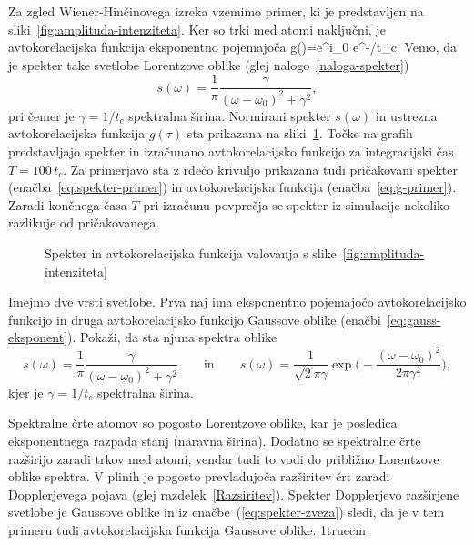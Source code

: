 Za zgled Wiener-Hinčinovega izreka vzemimo primer, ki je predstavljen na 
sliki~\ref{fig:amplituda-intenziteta}. 
Ker so trki med atomi naključni, je avtokorelacijska funkcija eksponentno pojemajoča
\beq
g(\tau)=e^{i\omega_{0}\tau} e^{-\tau/t_{c}}.
\label{eq:g-primer}
\eeq
Vemo, da je spekter take svetlobe Lorentzove 
oblike (glej nalogo~\ref{naloga-spekter})
\begin{equation}
s(\omega)=\frac{1}{\pi}\frac{\gamma}{(\omega-\omega_{0})^{2}+\gamma^{2}},
\label{eq:spekter-primer}
\end{equation}
pri čemer je $\gamma=1/t_{c}$ spektralna širina. 
Normirani spekter $s(\omega)$ in ustrezna avtokorelacijska funkcija $g(\tau)$ 
sta prikazana na sliki~\ref{fig:SpekterAc}. 
Točke na grafih 
predstavljajo spekter in izračunano avtokorelacijsko funkcijo 
za integracijski čas $T=100\,t_{c}$. Za primerjavo sta z rdečo 
krivuljo prikazana tudi pričakovani spekter (enačba~\ref{eq:spekter-primer}) in avtokorelacijska
funkcija (enačba~\ref{eq:g-primer}). Zaradi končnega
časa $T$ pri izračunu povprečja se spekter iz simulacije nekoliko razlikuje
od pričakovanega. 
\begin{figure}[h]
\centering
\def\svgwidth{65truemm} 
\qquad
\def\svgwidth{65truemm} 

\caption{Spekter in avtokorelacijska funkcija valovanja s slike~\ref{fig:amplituda-intenziteta}}
\label{fig:SpekterAc}
\end{figure}

\begin{definition}
\label{naloga-spekter}
Imejmo dve vrsti svetlobe. Prva naj ima eksponentno pojemajočo avtokorelacijsko funkcijo in druga
avtokorelacijsko funkcijo Gaussove oblike (enačbi~\ref{eq:gauss-eksponent}). Pokaži, da sta njuna
spektra oblike
\begin{equation}
s(\omega)=
\frac{1}{\pi}\frac{\gamma}{(\omega-\omega_{0})^{2}+\gamma^{2}} \qquad \mathrm{in} \qquad 
s(\omega)= \frac{1}{\sqrt{2}\pi\gamma}\exp\big(-
\frac{\left(\omega-\omega_{0}\right)^{2}}{2\pi\gamma^{2}}\big),
\end{equation}
kjer je $\gamma=1/t_{c}$ spektralna širina. 
\end{definition}

Spektralne črte atomov so pogosto Lorentzove oblike, kar je posledica
eksponentnega razpada stanj (naravna širina). Dodatno se spektralne
črte razširijo zaradi trkov med atomi, vendar tudi to vodi do približno Lorentzove
oblike spektra. V plinih je pogosto prevladujoča razširitev črt
zaradi Dopplerjevega pojava (glej razdelek~\ref{Razsiritev}). Spekter 
Dopplerjevo razširjene svetlobe je Gaussove oblike in iz enačbe~(\ref{eq:spekter-zveza})
sledi, da je v tem primeru tudi avtokorelacijska funkcija Gaussove oblike.
\vglue1truecm

